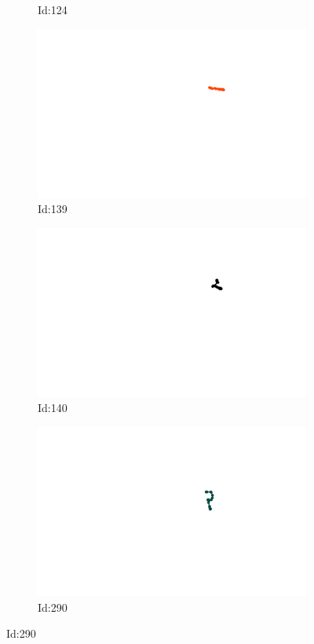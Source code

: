 \documentclass[12pt,twoside]{report}
\begin{document}
\begin{figure}
\begin{subfigure}[b]{0.20\textwidth}
\caption{Id:124}
\end{subfigure}
\begin{subfigure}[b]{0.20\textwidth}
\centering
\includegraphics[width=\textwidth]{../../trajectories/139.png}
\caption{Id:139}
\end{subfigure}
\begin{subfigure}[b]{0.20\textwidth}
\centering
\includegraphics[width=\textwidth]{../../trajectories/140.png}
\caption{Id:140}
\end{subfigure}
\begin{subfigure}[b]{0.20\textwidth}
\centering
\includegraphics[width=\textwidth]{../../trajectories/290.png}
\caption{Id:290}
\end{subfigure}
\end{figure}
\end{document}
